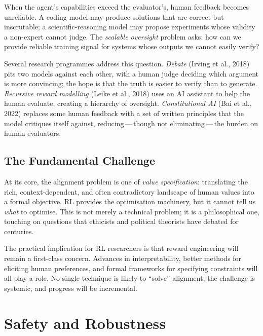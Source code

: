 When the agent's capabilities exceed the evaluator's, human feedback
becomes unreliable.  A coding model may produce solutions that are
correct but inscrutable; a scientific-reasoning model may propose
experiments whose validity a non-expert cannot judge.  The
\emph{scalable oversight} problem asks: how can we provide reliable
training signal for systems whose outputs we cannot easily verify?

Several research programmes address this question.  \emph{Debate}
(Irving et al., 2018) pits two models against each other, with a
human judge deciding which argument is more convincing; the hope is
that the truth is easier to verify than to generate.
\emph{Recursive reward modelling} (Leike et al., 2018) uses an
AI assistant to help the human evaluate, creating a hierarchy of
oversight.  \emph{Constitutional AI} (Bai et al., 2022) replaces
some human feedback with a set of written principles that the model
critiques itself against, reducing\,---\,though not
eliminating\,---\,the burden on human evaluators.

\subsection{The Fundamental Challenge}

At its core, the alignment problem is one of \emph{value
specification}: translating the rich,
context-dependent, and often contradictory landscape of human values
into a formal objective.  RL provides the optimisation machinery, but
it cannot tell us \emph{what} to optimise.  This is not merely a
technical problem; it is a philosophical one, touching on questions
that ethicists and political theorists have debated for centuries.

The practical implication for RL researchers is that reward engineering
will remain a first-class concern.  Advances in interpretability,
better methods for eliciting human preferences, and formal frameworks
for specifying constraints will all play a role.  No single technique
is likely to ``solve'' alignment; the challenge is systemic, and
progress will be incremental.


\section{Safety and Robustness}
\label{sec:open-safety}

